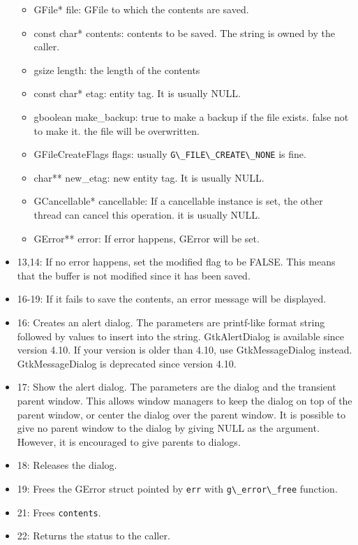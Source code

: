 \begin{itemize}
  \begin{itemize}
  \tightlist
  \item
    GFile* file: GFile to which the contents are saved.
  \item
    const char* contents: contents to be saved. The string is owned by
    the caller.
  \item
    gsize length: the length of the contents
  \item
    const char* etag: entity tag. It is usually NULL.
  \item
    gboolean make\_backup: true to make a backup if the file exists.
    false not to make it. the file will be overwritten.
  \item
    GFileCreateFlags flags: usually
    \passthrough{\lstinline!G\_FILE\_CREATE\_NONE!} is fine.
  \item
    char** new\_etag: new entity tag. It is usually NULL.
  \item
    GCancellable* cancellable: If a cancellable instance is set, the
    other thread can cancel this operation. it is usually NULL.
  \item
    GError** error: If error happens, GError will be set.
  \end{itemize}
\item
  13,14: If no error happens, set the modified flag to be FALSE. This
  means that the buffer is not modified since it has been saved.
\item
  16-19: If it fails to save the contents, an error message will be
  displayed.
\item
  16: Creates an alert dialog. The parameters are printf-like format
  string followed by values to insert into the string. GtkAlertDialog is
  available since version 4.10. If your version is older than 4.10, use
  GtkMessageDialog instead. GtkMessageDialog is deprecated since version
  4.10.
\item
  17: Show the alert dialog. The parameters are the dialog and the
  transient parent window. This allows window managers to keep the
  dialog on top of the parent window, or center the dialog over the
  parent window. It is possible to give no parent window to the dialog
  by giving NULL as the argument. However, it is encouraged to give
  parents to dialogs.
\item
  18: Releases the dialog.
\item
  19: Frees the GError struct pointed by \passthrough{\lstinline!err!}
  with \passthrough{\lstinline!g\_error\_free!} function.
\item
  21: Frees \passthrough{\lstinline!contents!}.
\item
  22: Returns the status to the caller.
\end{itemize}

